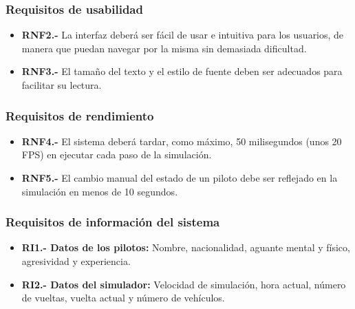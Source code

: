 \subsubsection{Requisitos de usabilidad}

\begin{itemize}
    \item \textbf{RNF2.-} La interfaz deberá ser fácil de usar e intuitiva para los usuarios, de manera que puedan navegar por la misma sin demasiada dificultad.
    \item \textbf{RNF3.-} El tamaño del texto y el estilo de fuente deben ser adecuados para facilitar su lectura.
\end{itemize}

\subsubsection{Requisitos de rendimiento}

\begin{itemize}
    \item \textbf{RNF4.-} El sistema deberá tardar, como máximo, 50 milisegundos (unos 20 FPS) en ejecutar cada paso de la simulación.
    \item \textbf{RNF5.-} El cambio manual del estado de un piloto debe ser reflejado en la simulación en menos de 10 segundos.
\end{itemize}

\subsubsection{Requisitos de información del sistema}

\begin{itemize}
    \item \textbf{RI1.- Datos de los pilotos:} Nombre, nacionalidad, aguante mental y físico, agresividad y experiencia.
    \item \textbf{RI2.- Datos del simulador:} Velocidad de simulación, hora actual, número de vueltas, vuelta actual y número de vehículos.
\end{itemize}

